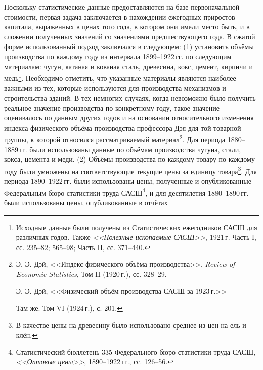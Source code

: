 \documentclass[leqno]{article}  %
\begin{document}
Поскольку статистические данные предоставляются на базе первоначальной стоимости, первая задача заключается в нахождении ежегодных приростов капитала, выраженных в ценах того года, в котором они имели место быть, и в сложении полученных значений со значениями предшествующего года. В сжатой форме использованный подход заключался в следующем: (1) установить объёмы производства по каждому году из интервала 1899--1922\,гг. по следующим материалам: чугун, катаная и кованая сталь, древесина, кокс, цемент, кирпичи и медь\footnote{Исходные данные были получены из Статистических ежегодников САСШ для различных годов. Также \emph{<<Полезные ископаемые САСШ>>}, 1921\,г. Часть I, сс. 235--82; 565--98; Часть II, сс. 371--440.}. Необходимо отметить, что указанные материалы являются наиболее важными из тех, которые используются для производства механизмов и строительства зданий. В тех немногих случаях, когда невозможно было получить реальное значение производства по конкретному году, такое значение оценивалось по данным других годов и на основании относительного изменения индекса физического объёма производства профессора Дэя для той товарной группы, к которой относился рассматриваемый материал\footnote{Э. Э. Дэй, <<Индекс физического объёма производства>>, \emph{Review of Economic Statistics}, Том II (1920\,г.), сс. 328--29.
\par
Э. Э. Дэй, <<Физический объём производства САСШ за 1923\,г.>>
\par
Там же. Том VI (1924\,г.), с. 201.}. Для периода 1880--1889\,гг. были использованы данные по объёмам производства чугуна, стали, кокса, цемента и меди. (2) Объёмы производства по каждому товару по каждому году были умножены на соответствующие текущие цены за единицу товара\footnote{В качестве цены на древесину было использовано среднее из цен на ель и клён. }. Для периода 1890--1922\,гг. были использованы цены, полученные и опубликованные Федеральным бюро статистики труда САСШ\footnote{Статистический бюллетень 335 Федерального бюро статистики труда САСШ, \emph{<<Оптовые цены>>}, 1890--1922\,гг., сс. 126--56.}, и для десятилетия 1880--1890\,гг. были использованы цены, опубликованные в отчётах
\end{document}

